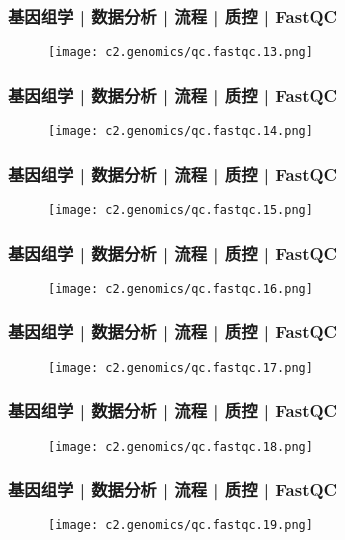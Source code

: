 \begin{frame}
  \frametitle{基因组学 | 数据分析 | 流程 | 质控 | FastQC}
  \begin{figure}
    \centering
    \texttt{[image: c2.genomics/qc.fastqc.13.png]}
  \end{figure}
\end{frame}

\begin{frame}
  \frametitle{基因组学 | 数据分析 | 流程 | 质控 | FastQC}
  \begin{figure}
    \centering
    \texttt{[image: c2.genomics/qc.fastqc.14.png]}
  \end{figure}
\end{frame}

\begin{frame}
  \frametitle{基因组学 | 数据分析 | 流程 | 质控 | FastQC}
  \begin{figure}
    \centering
    \texttt{[image: c2.genomics/qc.fastqc.15.png]}
  \end{figure}
\end{frame}

\begin{frame}
  \frametitle{基因组学 | 数据分析 | 流程 | 质控 | FastQC}
  \begin{figure}
    \centering
    \texttt{[image: c2.genomics/qc.fastqc.16.png]}
  \end{figure}
\end{frame}

\begin{frame}
  \frametitle{基因组学 | 数据分析 | 流程 | 质控 | FastQC}
  \begin{figure}
    \centering
    \texttt{[image: c2.genomics/qc.fastqc.17.png]}
  \end{figure}
\end{frame}

\begin{frame}
  \frametitle{基因组学 | 数据分析 | 流程 | 质控 | FastQC}
  \begin{figure}
    \centering
    \texttt{[image: c2.genomics/qc.fastqc.18.png]}
  \end{figure}
\end{frame}

\begin{frame}
  \frametitle{基因组学 | 数据分析 | 流程 | 质控 | FastQC}
  \begin{figure}
    \centering
    \texttt{[image: c2.genomics/qc.fastqc.19.png]}
  \end{figure}
\end{frame}


